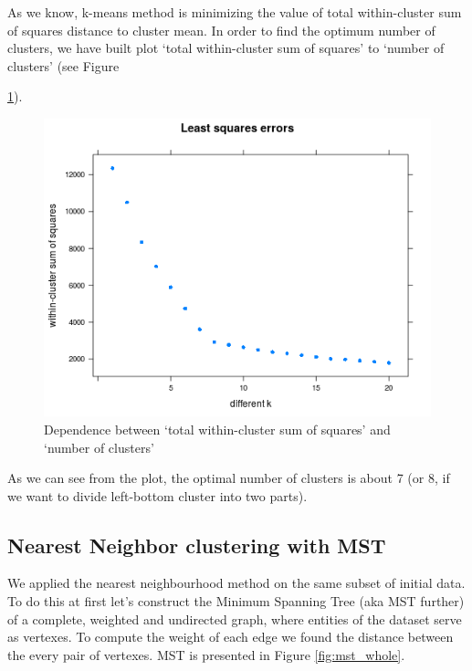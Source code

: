 As we know, k-means method is minimizing the value of total within-cluster sum of squares distance to cluster mean. 
In order to find the optimum number of clusters, we have built plot 
`total within-cluster sum of squares' to `number of clusters' (see Figure {\ref{fig:totalwithin-to-k}).

\begin{figure}[h]
	\centering
	\begin{minipage}[h]{0.49\linewidth}
\includegraphics[width=\linewidth]{images/totalwithin}
	\end{minipage}
	\caption{Dependence between `total within-cluster sum of squares' and `number of clusters'}
	\label{fig:totalwithin-to-k}	
\end{figure}

As we can see from the plot, the optimal number of clusters is about 7 (or 8, if we want to divide left-bottom cluster into two parts).

\subsection{Nearest Neighbor clustering with MST}

	We applied the nearest neighbourhood method on the same subset of initial data. To do this at first let's construct the Minimum Spanning Tree (aka MST further) of a complete, weighted and undirected graph, where entities of the dataset serve as vertexes. To compute the weight of each edge we found the distance between the every pair of vertexes. MST is presented in Figure \ref{fig:mst_whole}.

}

